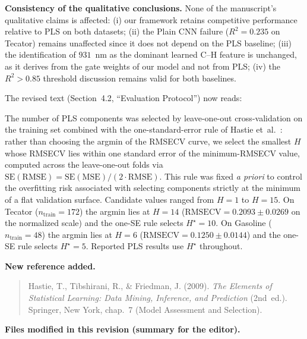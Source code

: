 \documentclass[11pt,a4paper]{article}
\newenvironment{revisedtext}
  {\begin{leftbar}\small}
  {\end{leftbar}}
\begin{document}
\medskip
\noindent\textbf{Consistency of the qualitative conclusions.}
None of the manuscript's qualitative claims is affected: (i) our
framework retains competitive performance relative to PLS on both
datasets; (ii) the Plain CNN failure ($R^{2}=0.235$ on Tecator) remains
unaffected since it does not depend on the PLS baseline; (iii) the
identification of $931$~nm as the dominant learned C--H feature is
unchanged, as it derives from the gate weights of our model and not
from PLS; (iv) the $R^{2}>0.85$ threshold discussion remains valid for
both baselines.

\medskip
\noindent The revised text (Section~4.2, ``Evaluation Protocol'') now
reads:

\begin{revisedtext}
The number of PLS components was selected by leave-one-out
cross-validation on the training set combined with the
one-standard-error rule of Hastie et~al.\ \cite{hastie2009elements}:
rather than choosing the argmin of the RMSECV curve, we select the
smallest $H$ whose RMSECV lies within one standard error of the
minimum-RMSECV value, computed across the leave-one-out folds via
$\mathrm{SE}(\mathrm{RMSE})=\mathrm{SE}(\mathrm{MSE})/(2\cdot\mathrm{RMSE})$.
This rule was fixed \emph{a priori} to control the overfitting risk
associated with selecting components strictly at the minimum of a flat
validation surface. Candidate values ranged from $H=1$ to $H=15$. On
Tecator ($n_{\text{train}}=172$) the argmin lies at $H=14$
($\mathrm{RMSECV}=0.2093\pm0.0269$ on the normalized scale) and the
one-SE rule selects $H^{\star}=10$. On Gasoline
($n_{\text{train}}=48$) the argmin lies at $H=6$
($\mathrm{RMSECV}=0.1250\pm0.0144$) and the one-SE rule selects
$H^{\star}=5$. Reported PLS results use $H^{\star}$ throughout.
\end{revisedtext}

\medskip
\noindent\textbf{New reference added.}

\begin{quote}
Hastie, T., Tibshirani, R., \& Friedman, J. (2009).
\textit{The Elements of Statistical Learning: Data Mining, Inference,
and Prediction} (2nd~ed.). Springer, New York, chap.~7 (Model
Assessment and Selection).
\end{quote}

\medskip
\noindent\textbf{Files modified in this revision (summary for the editor).}
\end{document}
